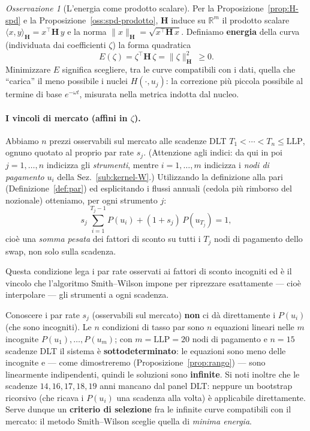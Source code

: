 \documentclass[11pt,a4paper]{article}
\theoremstyle{plain}
\theoremstyle{definition}
\theoremstyle{remark}
\newtheorem*{osservazione}{Osservazione}
\newcommand{\LLP}{\ensuremath{\mathrm{LLP}}}
\newcommand{\Hmat}{\mathbf{H}}
\newcommand{\transp}{^{\!\top}}
\begin{document}
\begin{osservazione}[L'energia come prodotto scalare]
\label{oss:energia}
Per la Proposizione~\ref{prop:H-spd} e la Proposizione~\ref{oss:spd-prodotto}, $\Hmat$
induce su $\mathbb{R}^m$ il prodotto scalare
$\langle x,y\rangle_{\Hmat} = x\transp\Hmat\,y$ e la norma
$\|x\|_{\Hmat} = \sqrt{x\transp\Hmat\,x}$.
Definiamo \textbf{energia} della curva (individuata dai coefficienti $\zeta$) la forma quadratica
\[
  E(\zeta) = \zeta\transp \Hmat\, \zeta = \|\zeta\|_{\Hmat}^2 \ \ge 0 .
\]
Minimizzare $E$ significa scegliere, tra le curve compatibili con i dati, quella che ``carica''
il meno possibile i nuclei $H(\cdot,u_j)$: la correzione pi\`u piccola possibile al termine di
base $e^{-\omega t}$, misurata nella metrica indotta dal nucleo.
\end{osservazione}

\paragraph{I vincoli di mercato (affini in $\zeta$).}
Abbiamo $n$ prezzi osservabili sul mercato alle scadenze DLT $T_1<\cdots<T_n\le\LLP$, ognuno
quotato al proprio par rate $s_j$. (Attenzione agli indici: da qui in poi $j=1,\dots,n$
indicizza gli \emph{strumenti}, mentre $i=1,\dots,m$ indicizza i \emph{nodi di pagamento}
$u_i$ della Sez.~\ref{sub:kernel-W}.) Utilizzando la definizione alla pari
(Definizione~\ref{def:par}) ed esplicitando i flussi annuali (cedola pi\`u rimborso del
nozionale) otteniamo, per ogni strumento $j$:
\[
  s_j\,\sum_{i=1}^{T_j-1} P(u_i) + (1+s_j)\,P(u_{T_j}) = 1,
\]
cio\`e una \emph{somma pesata} dei fattori di sconto su tutti i $T_j$ nodi di pagamento dello
swap, non solo sulla scadenza.

Questa condizione lega i par rate osservati ai fattori di sconto incogniti ed \`e il vincolo che
l'algoritmo Smith--Wilson impone per riprezzare esattamente --- cio\`e interpolare --- gli
strumenti a ogni scadenza.

Conoscere i par rate $s_j$ (osservabili sul mercato) \textbf{non} ci d\`a direttamente i
$P(u_i)$ (che sono incogniti). Le $n$ condizioni di tasso par sono $n$ equazioni lineari nelle $m$
incognite $P(u_1),\ldots,P(u_m)$; con $m = \LLP = 20$ nodi di pagamento e $n = 15$ scadenze
DLT il sistema \`e \textbf{sottodeterminato}: le equazioni sono meno delle incognite e ---
come dimostreremo (Proposizione~\ref{prop:rango}) --- sono linearmente indipendenti, quindi
le soluzioni sono \textbf{infinite}. Si noti inoltre che le scadenze $14, 16, 17, 18, 19$
anni mancano dal panel DLT: neppure un bootstrap ricorsivo (che ricava i $P(u_i)$ una
scadenza alla volta) \`e applicabile direttamente. Serve dunque un \textbf{criterio di
selezione} fra le infinite curve compatibili con il mercato: il metodo Smith--Wilson
sceglie quella di \emph{minima energia}.
\end{document}
